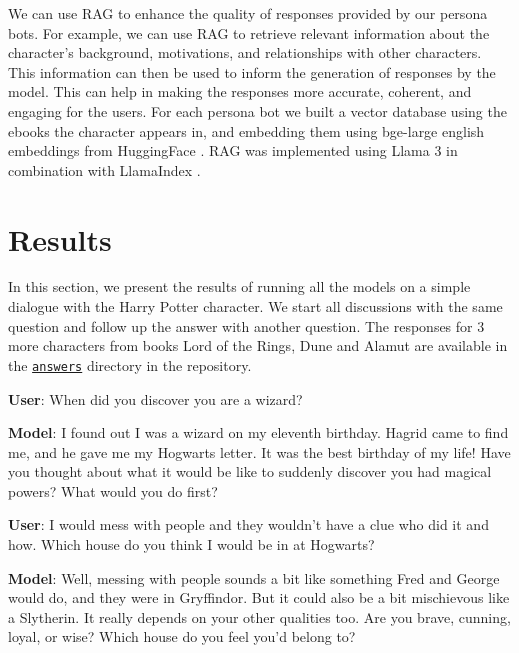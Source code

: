 \documentclass[fleqn,moreauthors,10pt]{ds_report}
\begin{document}
We can use RAG to enhance the quality of responses provided by our persona bots.
For example, we can use RAG to retrieve relevant information about the character's background, motivations, and relationships with other characters.
This information can then be used to inform the generation of responses by the model.
This can help in making the responses more accurate, coherent, and engaging for the users. 
For each persona bot we built a vector database using the ebooks the character appears in, and embedding them using bge-large english embeddings from HuggingFace \cite{bge_embedding}.
RAG was implemented using Llama 3 in combination with LlamaIndex \cite{Liu_LlamaIndex_2022}. 

\section*{Results}

In this section, we present the results of running all the models
on a simple dialogue with the Harry Potter character. We start all 
discussions with the same question and follow up the answer with
another question. The responses for $3$ more characters from books
Lord of the Rings, Dune and Alamut are available in the
\href{https://github.com/UL-FRI-NLP-2023-2024/ul-fri-nlp-course-project-kafkanet/tree/main/answers}{\texttt{answers}} directory in the repository.

\begin{tcolorbox}[
    title=ChatGPT,
    colback=white!95!black,
    colbacktitle=white!85!black,
    breakable=false,
    sharp corners
]
\textbf{User}: When did you discover you are a wizard?

\textbf{Model}: I found out I was a wizard on my eleventh birthday. Hagrid came
to find me, and he gave me my Hogwarts letter. It was the best birthday
of my life! Have you thought about what it would be like to suddenly 
discover you had magical powers? What would you do first?

\textbf{User}: I would mess with people and they wouldn't have a clue who did it
and how. Which house do you think I would be in at Hogwarts?

\textbf{Model}: Well, messing with people sounds a bit like something Fred and
George would do, and they were in Gryffindor. But it could also be a bit
mischievous like a Slytherin. It really depends on your other qualities
too. Are you brave, cunning, loyal, or wise? Which house do you feel
you'd belong to?
\end{tcolorbox}
\end{document}
